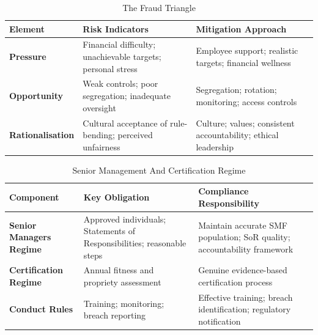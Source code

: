 \begin{table}[H]
  \centering
  \renewcommand{\arraystretch}{1.5}
  \begin{tabularx}{\textwidth}{ | >{\raggedright\arraybackslash}p{} 
								| >{\raggedright\arraybackslash}p{} 
                                | >{\raggedright\arraybackslash}X | }
    \hline
    \textbf{Element} & \textbf{Risk Indicators} & \textbf{Mitigation Approach} \\
    \hline
    \textbf{Pressure} & Financial difficulty; unachievable targets; personal stress & Employee support; realistic targets; financial wellness\\
    \hline
    \textbf{Opportunity} & Weak controls; poor segregation; inadequate oversight & Segregation; rotation; monitoring; access controls\\
    \hline
    \textbf{Rationalisation} & Cultural acceptance of rule-bending; perceived unfairness & Culture; values; consistent accountability; ethical leadership\\
    \hline
  \end{tabularx}
  \caption{The Fraud Triangle}
\end{table}

\begin{table}[H]
  \centering
  \renewcommand{\arraystretch}{1.5}
  \begin{tabularx}{\textwidth}{ | >{\raggedright\arraybackslash}p{} 
								| >{\raggedright\arraybackslash}p{} 
                                | >{\raggedright\arraybackslash}X | }
    \hline
    \textbf{Component} & \textbf{Key Obligation} & \textbf{Compliance Responsibility} \\
    \hline
    \textbf{Senior Managers Regime} & Approved individuals; Statements of Responsibilities; reasonable steps & Maintain accurate SMF population; SoR quality; accountability framework\\
    \hline
    \textbf{Certification Regime} & Annual fitness and propriety assessment & Genuine evidence-based certification process\\
    \hline
    \textbf{Conduct Rules} & Training; monitoring; breach reporting & Effective training; breach identification; regulatory notification\\
    \hline
  \end{tabularx}
  \caption{Senior Management And Certification Regime}
\end{table}

